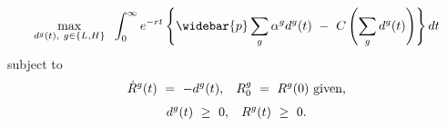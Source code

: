 \begin{equation}
\begin{split}
    \underset{d^{g}(t), \ g \in \{L, H\}}{\max} \hspace{0.2cm} \int_{0}^{\infty} e^{-rt} \left\{ \widebar{p} \sum_{g} \alpha^{g} d^{g}(t) \ - \ C\left( \sum_{g} d^{g}(t) \right) \right\} dt
\end{split}
\label{Equation:AKS-Style-Model_Objective-Function}
\end{equation}
subject to
\begin{equation}
\begin{split}
    \dot{R}^{g}(t) \ = \ - d^{g}(t), \hspace{0.3cm} R_{0}^{g} \ = \ R^{g}(0) \ \text{given,} 
\end{split}
\end{equation}
\begin{equation}
\begin{split}
    d^{g}(t) \ \geq \ 0, \hspace{0.3cm} R^{g}(t) \ \geq \ 0.
\end{split}
\end{equation}
